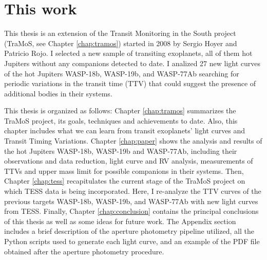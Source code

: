 \section{This work}

This thesis is an extension of the Transit Monitoring in the South project (TraMoS, see Chapter \ref{chap:tramos}) started in 2008 by Sergio Hoyer and Patricio Rojo. I selected a new sample of transiting exoplanets, all of them hot Jupiters without any companions detected to date.  I analized 27 new light curves of the hot Jupiters WASP-18b, WASP-19b, and WASP-77Ab searching for periodic variations in the transit time (TTV) that could suggest the presence of additional bodies in their systems. 

This thesis is organized as follows: Chapter \ref{chap:tramos} summarizes the TraMoS project, its goals, techniques and achievements to date. Also, this chapter includes what we can learn from transit exoplanets' light curves and Transit Timing Variations. Chapter \ref{chap:paper} shows the analysis and results of the hot Jupiters WASP-18b, WASP-19b and WASP-77Ab, including  their observations and data reduction, light curve and RV analysis, measurements of TTVs and upper mass limit for possible companions in their systems. Then, Chapter \ref{chap:tess}  recapitulates the current stage of the TraMoS project on which TESS data is being incorporated. Here, I re-analyze the TTV curves of the previous targets WASP-18b, WASP-19b, and WASP-77Ab with new light curves from TESS. Finally, Chapter \ref{chap:conclusion} contains the principal conclusions of this thesis as well as some ideas for future work. The Appendix section includes a brief description of the aperture photometry pipeline utilized, all the Python scripts used to generate each light curve, and an example of the PDF file obtained after the aperture photometry procedure.

